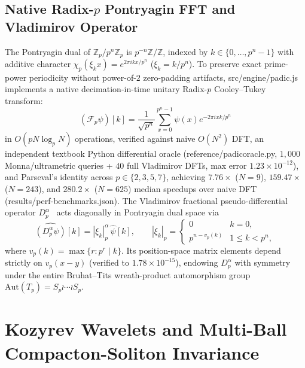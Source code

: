 \documentclass[11pt,a4paper]{article}
\numberwithin{equation}{section}
\theoremstyle{plain}
\theoremstyle{definition}
\theoremstyle{remark}
\newcommand{\Z}{\mathbb{Z}}
\newcommand{\Zp}{\mathbb{Z}_p}
\newcommand{\Tp}{T_p}
\newcommand{\Dp}{D_p^\alpha}
\newcommand{\Aut}{\mathrm{Aut}}
\newcommand{\code}[1]{{\ttfamily\footnotesize\def\_{\textunderscore\penalty0\hskip0pt}#1}}
\begin{document}
\subsection{Native Radix-\texorpdfstring{$p$}{p} Pontryagin FFT and Vladimirov Operator}
The Pontryagin dual of $\Zp / p^n\Zp$ is $p^{-n}\Z / \Z$, indexed by $k \in \{0,\dots,p^n-1\}$ with additive character $\chi_p(\xi_k x) = e^{2\pi i k x / p^n}$ ($\xi_k = k/p^n$). To preserve exact prime-power periodicity without power-of-$2$ zero-padding artifacts, \code{src/engine/padic.js} implements a native decimation-in-time unitary Radix-$p$ Cooley--Tukey transform:
\begin{equation}
  (\mathcal{F}_p \psi)[k] = \frac{1}{\sqrt{p^n}} \sum_{x=0}^{p^n-1} \psi(x) e^{-2\pi i x k / p^n}
  \label{eq:radix-fft}
\end{equation}
in $O(p N \log_p N)$ operations, verified against naive $O(N^2)$ DFT, an independent textbook Python differential oracle (\code{reference/padic\_oracle.py}, $1{,}000$ Monna/ultrametric queries + $40$ full Vladimirov DFTs, max error $1.23\times 10^{-12}$), and Parseval's identity across $p \in \{2,3,5,7\}$, achieving $7.76\times$ ($N=9$), $159.47\times$ ($N=243$), and $280.2\times$ ($N=625$) median speedups over naive DFT (\code{results/perf-benchmarks.json}). The Vladimirov fractional pseudo-differential operator $\Dp$~\cite{Vladimirov1994} acts diagonally in Pontryagin dual space via
\begin{equation}
  \widehat{(\Dp \psi)}[k] = |\xi_k|_p^\alpha \, \hat{\psi}[k], \qquad
  |\xi_k|_p = \begin{cases} 0 & k = 0, \\ p^{n - v_p(k)} & 1 \le k < p^n, \end{cases}
  \label{eq:vladimirov}
\end{equation}
where $v_p(k) = \max\{r : p^r \mid k\}$. Its position-space matrix elements depend strictly on $v_p(x - y)$ (verified to $1.78\times 10^{-15}$), endowing $\Dp$ with symmetry under the entire Bruhat--Tits wreath-product automorphism group $\Aut(\Tp) = S_p \wr \cdots \wr S_p$.

\section{Kozyrev Wavelets and Multi-Ball Compacton-Soliton Invariance}
\label{sec:solitons}
\end{document}
